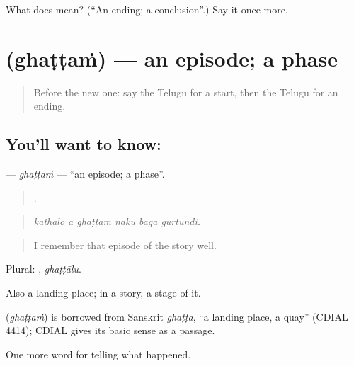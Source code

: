 \begin{tcolorbox}[breakable,colback=teal!4,colframe=teal!35!black,title={Before you move on}]
What does  mean? (\textquotedblleft{}An ending; a conclusion\textquotedblright{}.) Say it once more.
\end{tcolorbox}
\section[\texorpdfstring{\te{ఘట్టం} (ghaṭṭaṁ)}{ఘట్టం (ghaṭṭaṁ)}]{ (ghaṭṭaṁ) — an episode; a phase}

\label{lesson:TE-C376-ghattam}



\begin{quote}
Before the new one: say the Telugu for a start, then the Telugu for an ending.
\end{quote}

\subsection*{You'll want to know: }
\textbf{} — \emph{ghaṭṭaṁ} — \textquotedblleft{}an episode; a phase\textquotedblright{}.

\begin{quote}
     .
\end{quote}

\begin{quote}
\emph{kathalō ā ghaṭṭaṁ nāku bāgā gurtundi.}
\end{quote}

\begin{quote}
I remember that episode of the story well.
\end{quote}

Plural: , \emph{ghaṭṭālu}.

Also a landing place; in a story, a stage of it.

\begin{cousinweb}
\textbf{} (\emph{ghaṭṭaṁ}) is borrowed from Sanskrit \emph{ghaṭṭa}, \textquotedblleft{}a landing place, a quay\textquotedblright{} (CDIAL 4414); CDIAL gives its basic sense as a passage.
\end{cousinweb}

\begin{grammarlens}[title={What you've built}]
One more word for telling what happened.
\end{grammarlens}

